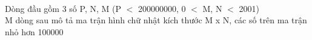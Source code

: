 \\   Dòng đầu gồm 3 số P, N, M (P $<$ 200000000, 0 $<$ M, N $<$ 2001)   
\\   M dòng sau mô tả ma trận hình chữ nhật kích thước M x N, các số trên ma trận nhỏ hơn 100000  

\